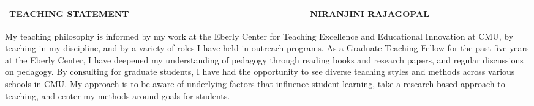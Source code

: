 \documentclass[10pt]{article}
\date{}
\begin{document}

\begin{table}
\color{blue}
\begin{tabular*}{\textwidth}{l r}
\large\textbf{TEACHING STATEMENT} & 
\hfill \ \ \ \ \ \ \ \ \ \ \ \ \ \ \ \ \ \ \ \
\ \ \ \ \ \ \ \ \ \ \ \ \ \ \ 
\large\textbf{NIRANJINI RAJAGOPAL}\\
\hline
\end{tabular*}

\end{table}




My teaching philosophy is informed by my work at the Eberly Center for Teaching Excellence and Educational Innovation at CMU, by teaching in my discipline, and by a variety of roles I have held in outreach programs. As a Graduate Teaching Fellow for the past five years at the Eberly Center, I have deepened my understanding of pedagogy through reading books and research papers, and regular discussions on pedagogy. By consulting for graduate students, I have had the opportunity to see diverse teaching styles and methods across various schools in CMU. 
My approach is to be aware of underlying factors that influence student learning, take a research-based approach to teaching, and center my methods around goals for students. \\%


\end{document}
